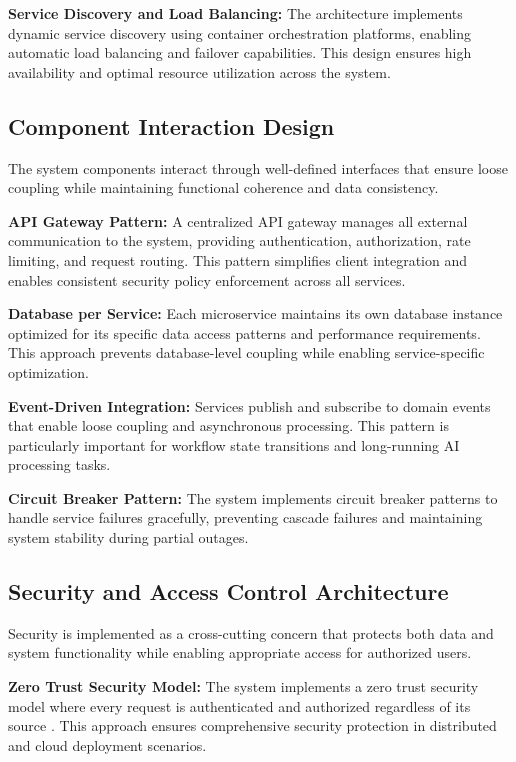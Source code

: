 \textbf{Service Discovery and Load Balancing:} The architecture implements dynamic service discovery using container orchestration platforms, enabling automatic load balancing and failover capabilities. This design ensures high availability and optimal resource utilization across the system.

\subsection{Component Interaction Design}

The system components interact through well-defined interfaces that ensure loose coupling while maintaining functional coherence and data consistency.

\textbf{API Gateway Pattern:} A centralized API gateway manages all external communication to the system, providing authentication, authorization, rate limiting, and request routing. This pattern simplifies client integration and enables consistent security policy enforcement across all services.

\textbf{Database per Service:} Each microservice maintains its own database instance optimized for its specific data access patterns and performance requirements. This approach prevents database-level coupling while enabling service-specific optimization.

\textbf{Event-Driven Integration:} Services publish and subscribe to domain events that enable loose coupling and asynchronous processing. This pattern is particularly important for workflow state transitions and long-running AI processing tasks.

\textbf{Circuit Breaker Pattern:} The system implements circuit breaker patterns to handle service failures gracefully, preventing cascade failures and maintaining system stability during partial outages.

\subsection{Security and Access Control Architecture}

Security is implemented as a cross-cutting concern that protects both data and system functionality while enabling appropriate access for authorized users.

\textbf{Zero Trust Security Model:} The system implements a zero trust security model where every request is authenticated and authorized regardless of its source \cite{rose2020zero}. This approach ensures comprehensive security protection in distributed and cloud deployment scenarios.

